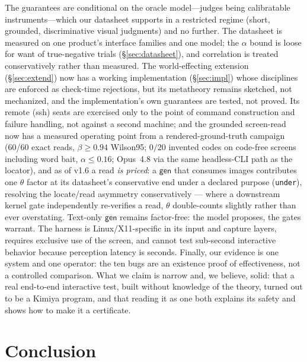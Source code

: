 \documentclass[acmsmall,screen,nonacm]{acmart}
\newcommand{\gen}{\mathsf{gen}}
\newcommand{\conf}{\theta}
\theoremstyle{acmdefinition}%
\theoremstyle{acmplain}%
\begin{document}
The guarantees are conditional on the oracle model---judges being
calibratable instruments---which our datasheet supports in a restricted
regime (short, grounded, discriminative visual judgments) and no further.
The datasheet is measured on one product's interface families and one
model; the $\alpha$ bound is loose for want of true-negative trials
(\S\ref{sec:datasheet}), and correlation is treated conservatively rather
than measured. The world-effecting extension (\S\ref{sec:extend}) now has a working
implementation (\S\ref{sec:impl}) whose disciplines are enforced as
check-time rejections, but its metatheory remains sketched, not
mechanized, and the implementation's own guarantees are tested, not
proved. Its remote (ssh) seats are exercised only to the point of
command construction and failure handling, not against a second
machine; and the grounded screen-read now has a measured operating point
from a rendered-ground-truth campaign (60/60 exact reads,
$\beta \ge 0.94$ Wilson95; $0/20$ invented codes on code-free screens
including word bait, $\alpha \le 0.16$; Opus~4.8 via the same
headless-CLI path as the locator), and as of v1.6 a read \emph{is priced}: a $\gen$ that consumes
images contributes one $\conf$ factor at its datasheet's conservative
end under a declared purpose (\texttt{under}), resolving the
locate/read asymmetry conservatively --- where a downstream kernel gate
independently re-verifies a read, $\conf$ double-counts slightly
rather than ever overstating. Text-only $\gen$ remains factor-free:
the model proposes, the gates warrant. The harness
is Linux/X11-specific in its input and capture layers, requires exclusive
use of the screen, and cannot test sub-second interactive behavior because
perception latency is seconds. Finally, our evidence is one system and one
operator: the ten bugs are an existence proof of effectiveness, not a
controlled comparison. What we claim is narrow and, we believe, solid:
that a real end-to-end interactive test, built without knowledge of the
theory, turned out to be a Kimiya program, and that reading it as one both
explains its safety and shows how to make it a certificate.

\section{Conclusion}
\label{sec:conclusion}
\end{document}
